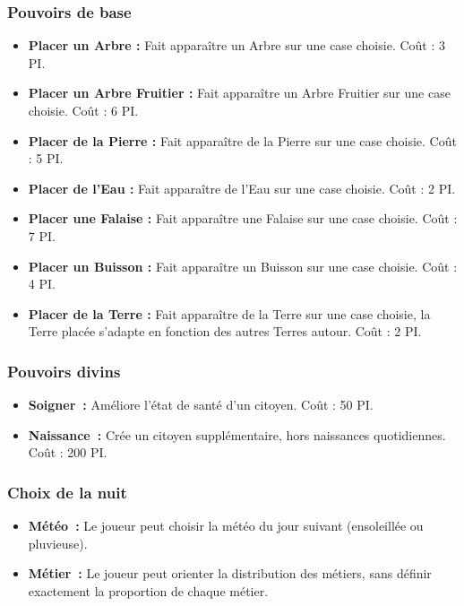 \documentclass[a4paper]{article}
\begin{document}
      \subsubsection{Pouvoirs de base}
        \begin{itemize}
          \item \textbf{Placer un Arbre :} \small{ Fait apparaître un Arbre sur une case choisie. Coût : 3 PI.}
          \item \textbf{Placer un Arbre Fruitier :} \small{ Fait apparaître un Arbre Fruitier sur une case choisie. Coût : 6 PI.}
          \item \textbf{Placer de la Pierre :} \small{ Fait apparaître de la Pierre sur une case choisie. Coût : 5 PI.}
          \item \textbf{Placer de l'Eau :} \small{ Fait apparaître de l'Eau sur une case choisie. Coût : 2 PI.}
          \item \textbf{Placer une Falaise :} \small{ Fait apparaître une Falaise sur une case choisie. Coût : 7 PI.}
          \item \textbf{Placer un Buisson :} \small{ Fait apparaître un Buisson sur une case choisie. Coût : 4 PI.}
          \item \textbf{Placer de la Terre :} \small{ Fait apparaître de la Terre sur une case choisie, la Terre placée s'adapte en fonction des autres Terres autour. Coût : 2 PI.}
        \end{itemize}

      \subsubsection{Pouvoirs divins}
        \begin{itemize}
          \item \textbf{Soigner :} \small{ Améliore l'état de santé d'un citoyen. Coût : 50 PI.}
          \item \textbf{Naissance :} \small{ Crée un citoyen supplémentaire, hors naissances quotidiennes. Coût : 200 PI.}
        \end{itemize}

      \subsubsection{Choix de la nuit}
        \begin{itemize}
          \item \textbf{Météo :} \small{ Le joueur peut choisir la météo du jour suivant (ensoleillée ou pluvieuse).}
          \item \textbf{Métier :} \small{ Le joueur peut orienter la distribution des métiers, sans définir exactement la proportion de chaque métier.}
        \end{itemize}
\end{document}
